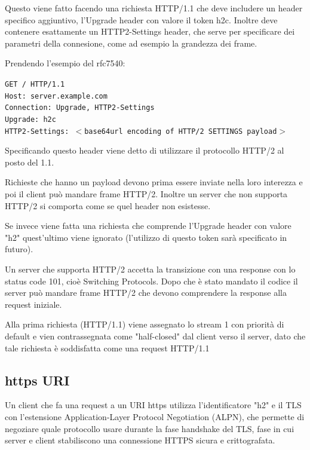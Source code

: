 \documentclass[12pt, a4paper]{article} %
\begin{document}
Questo viene fatto facendo una richiesta HTTP/1.1 che deve includere un header specifico aggiuntivo, l'Upgrade header con valore il token h2c.
Inoltre deve contenere esattamente un HTTP2-Settings header, che serve per specificare dei parametri della connesione, come ad esempio la grandezza dei frame.

Prendendo l'esempio del rfc7540:

\noindent %

  \begin{minipage}{\textwidth}
    \vspace{10pt} %
    \hspace{10pt} %
    \begin{minipage}{0.9\textwidth} %
      \texttt{GET / HTTP/1.1\\
      Host: server.example.com\\
      Connection: Upgrade, HTTP2-Settings\\
      Upgrade: h2c\\
      HTTP2-Settings: $<$base64url encoding of HTTP/2 SETTINGS payload$>$}
    \end{minipage}
    \vspace{10pt} %
  \end{minipage}%

Specificando questo header viene detto di utilizzare il protocollo HTTP/2 al posto del 1.1.

Richieste che hanno un payload devono prima essere inviate nella loro interezza e poi il client può mandare frame HTTP/2.
Inoltre un server che non supporta HTTP/2 si comporta come se quel header non esistesse.

Se invece viene fatta una richiesta che comprende l'Upgrade header con valore "h2" quest'ultimo viene ignorato (l'utilizzo di questo token sarà specificato in futuro).

Un server che supporta HTTP/2 accetta la transizione con una response con lo status code 101, cioè Switching Protocols. 
Dopo che è stato mandato il codice il server può mandare frame HTTP/2 che devono comprendere la response alla request iniziale.

Alla prima richiesta (HTTP/1.1) viene assegnato lo stream 1 con priorità di default e vien contrassegnata come "half-closed" 
dal client verso il server, dato che tale richiesta è soddisfatta come una request HTTP/1.1

\subsection{https URI}
Un client che fa una request a un URI https utilizza l'identificatore "h2" e il TLS con l'estensione Application-Layer Protocol Negotiation (ALPN), che permette di negoziare quale protocollo
usare durante la fase handshake del TLS, fase in cui server e client stabiliscono una connessione HTTPS sicura e crittografata.
\end{document}
